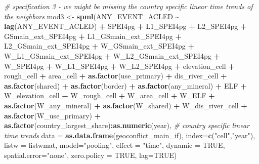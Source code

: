 \documentclass[
  a4paper,
]{article}
\newenvironment{Shaded}{\begin{snugshade}}{\end{snugshade}}
\newcommand{\AttributeTok}[1]{\textcolor[rgb]{0.13,0.29,0.53}{#1}}
\newcommand{\CommentTok}[1]{\textcolor[rgb]{0.56,0.35,0.01}{\textit{#1}}}
\newcommand{\ConstantTok}[1]{\textcolor[rgb]{0.56,0.35,0.01}{#1}}
\newcommand{\FunctionTok}[1]{\textcolor[rgb]{0.13,0.29,0.53}{\textbf{#1}}}
\newcommand{\NormalTok}[1]{#1}
\newcommand{\OtherTok}[1]{\textcolor[rgb]{0.56,0.35,0.01}{#1}}
\newcommand{\SpecialCharTok}[1]{\textcolor[rgb]{0.81,0.36,0.00}{\textbf{#1}}}
\newcommand{\StringTok}[1]{\textcolor[rgb]{0.31,0.60,0.02}{#1}}
\begin{document}
\begin{Shaded}
\begin{Highlighting}[]
\CommentTok{\# specification 3 {-} we might be missing the country specific linear time trends of the neighbors }
\NormalTok{mod3 }\OtherTok{\textless{}{-}} \FunctionTok{spml}\NormalTok{(ANY\_EVENT\_ACLED }\SpecialCharTok{\textasciitilde{}} \FunctionTok{lag}\NormalTok{(ANY\_EVENT\_ACLED) }\SpecialCharTok{+}\NormalTok{ SPEI4pg }\SpecialCharTok{+}\NormalTok{ L1\_SPEI4pg }\SpecialCharTok{+}\NormalTok{ L2\_SPEI4pg }\SpecialCharTok{+}\NormalTok{ GSmain\_ext\_SPEI4pg }\SpecialCharTok{+}\NormalTok{ L1\_GSmain\_ext\_SPEI4pg }\SpecialCharTok{+}\NormalTok{ L2\_GSmain\_ext\_SPEI4pg }\SpecialCharTok{+}\NormalTok{ W\_GSmain\_ext\_SPEI4pg }\SpecialCharTok{+}
\NormalTok{                               W\_L1\_GSmain\_ext\_SPEI4pg }\SpecialCharTok{+}\NormalTok{ W\_L2\_GSmain\_ext\_SPEI4pg }\SpecialCharTok{+}\NormalTok{ W\_SPEI4pg }\SpecialCharTok{+}\NormalTok{ W\_L1\_SPEI4pg }\SpecialCharTok{+}\NormalTok{ W\_L2\_SPEI4pg }\SpecialCharTok{+}\NormalTok{ elevation\_cell }\SpecialCharTok{+} 
\NormalTok{                               rough\_cell }\SpecialCharTok{+}\NormalTok{ area\_cell }\SpecialCharTok{+} \FunctionTok{as.factor}\NormalTok{(use\_primary) }\SpecialCharTok{+}\NormalTok{ dis\_river\_cell }\SpecialCharTok{+} \FunctionTok{as.factor}\NormalTok{(shared) }\SpecialCharTok{+}  \FunctionTok{as.factor}\NormalTok{(border) }\SpecialCharTok{+} \FunctionTok{as.factor}\NormalTok{(any\_mineral) }\SpecialCharTok{+}
\NormalTok{                               ELF }\SpecialCharTok{+}\NormalTok{ W\_elevation\_cell }\SpecialCharTok{+}\NormalTok{ W\_rough\_cell }\SpecialCharTok{+}\NormalTok{ W\_area\_cell }\SpecialCharTok{+}\NormalTok{ W\_ELF }\SpecialCharTok{+} \FunctionTok{as.factor}\NormalTok{(W\_any\_mineral) }\SpecialCharTok{+} \FunctionTok{as.factor}\NormalTok{(W\_shared)  }\SpecialCharTok{+} 
\NormalTok{                               W\_dis\_river\_cell }\SpecialCharTok{+} \FunctionTok{as.factor}\NormalTok{(W\_use\_primary) }\SpecialCharTok{+} \FunctionTok{as.factor}\NormalTok{(country\_largest\_share)}\SpecialCharTok{:}\FunctionTok{as.numeric}\NormalTok{(year), }\CommentTok{\# country specific linear time trends}
                             \AttributeTok{data =} \FunctionTok{as.data.frame}\NormalTok{(geoconflict\_main\_if), }
                             \AttributeTok{index=}\FunctionTok{c}\NormalTok{(}\StringTok{"cell"}\NormalTok{,}\StringTok{"year"}\NormalTok{),}
                             \AttributeTok{listw =}\NormalTok{ listwmat,}
                             \AttributeTok{model=}\StringTok{"pooling"}\NormalTok{,}
                             \AttributeTok{effect =} \StringTok{"time"}\NormalTok{,  }
                             \AttributeTok{dynamic =} \ConstantTok{TRUE}\NormalTok{,}
                             \AttributeTok{spatial.error=}\StringTok{"none"}\NormalTok{,}
                             \AttributeTok{zero.policy =} \ConstantTok{TRUE}\NormalTok{, }
                             \AttributeTok{lag=}\ConstantTok{TRUE}\NormalTok{)}


\end{Highlighting}
\end{Shaded}
\end{document}
